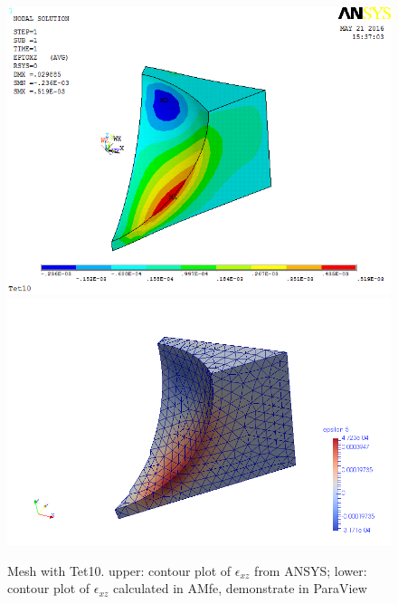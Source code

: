 \begin{figure}[htbp]
	\begin{center}
		\includegraphics[width=13cm,clip]{Tet10_Exz.png} 		
		\includegraphics[width=13cm,clip]{Tet10_Exz_P.png} 		
		\caption{Mesh with Tet10. upper: contour plot of $\epsilon_{xz}$ from ANSYS; lower: contour plot of $\epsilon_{xz}$ calculated in AMfe, demonstrate in ParaView} \label{fig: Tet10_Exz}
	\end{center}
\end{figure}

